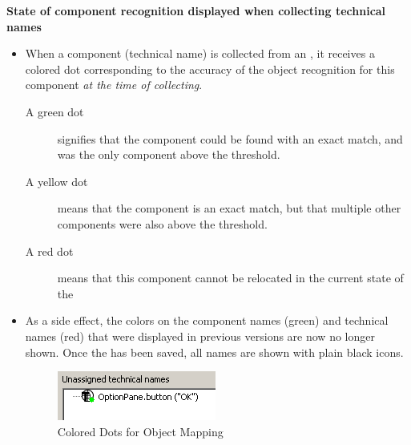 \textbf{State of component recognition displayed when collecting technical names}
\label{RNCompRec}
\begin{itemize}
\item When a component (technical name) is collected from an \gdaut{}, it receives a colored
dot corresponding to the accuracy of the object recognition for this component \textit{at the time of collecting}.
\begin{description}
\item [A green dot]{signifies that the component could be found with an exact match, and was the only component above the threshold}.
\item [A yellow dot]{means that the component is an exact match, but that multiple other components were also above the threshold.}
\item [A red dot]{ means that this component cannot be relocated in the current state of the \gdaut{}}
\end{description}
\item As a side effect, the colors on the component names (green) and technical names (red) that were displayed in previous versions are now no longer shown. Once the \gdomeditor{} has been saved, all names are shown with plain black icons. 
\begin{figure}[h]
\begin{center}
\includegraphics{52/ps/ColorDot}
\caption{Colored Dots for Object Mapping}
\label{RNColorDot}
\end{center}
\end{figure}
\end{itemize}

